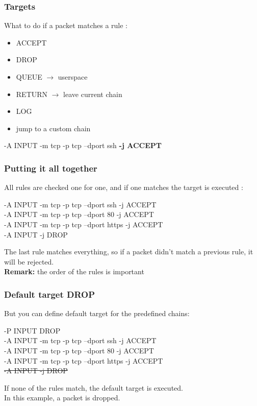 \documentclass[14pt]{beamer}
\begin{document}
  \begin{frame}
    \frametitle{Targets}
    What to do if a packet matches a rule :
    \begin{itemize}
      \item ACCEPT
      \item DROP
      \item QUEUE $\rightarrow$ userspace
      \item RETURN $\rightarrow$ leave current chain
      \item LOG
      \item jump to a custom chain
    \end{itemize}
    \begin{example}
      \small{-A INPUT -m tcp -p tcp --dport ssh \textbf{-j ACCEPT}}
    \end{example}
  \end{frame}
  \begin{frame}
    \frametitle{Putting it all together}
    All rules are checked one for one, and if one matches the target is executed :
    \begin{example}
      \small{-A INPUT -m tcp -p tcp --dport ssh -j ACCEPT\\
      -A INPUT -m tcp -p tcp --dport 80 -j ACCEPT\\
      -A INPUT -m tcp -p tcp --dport https -j ACCEPT\\
      -A INPUT -j DROP}
    \end{example}
    The last rule matches everything, so if a packet didn't match a previous rule, it will be rejected.\\
    \pause
    \textbf{Remark:} the order of the rules is important
 \end{frame}
  \begin{frame}
    \frametitle{Default target DROP}
    But you can define default target for the predefined chains:
    \begin{example}
      \small{-P INPUT DROP\\
      -A INPUT -m tcp -p tcp --dport ssh -j ACCEPT\\
      -A INPUT -m tcp -p tcp --dport 80 -j ACCEPT\\
      -A INPUT -m tcp -p tcp --dport https -j ACCEPT\\
      \sout{-A INPUT -j DROP}}
    \end{example}
    If none of the rules match, the default target is executed.\\
    In this example, a packet is dropped.
  \end{frame}
\end{document}

